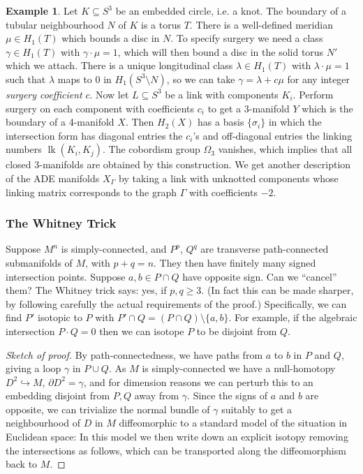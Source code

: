 \documentclass{article}
\theoremstyle{definition}
\newtheorem*{example}{Example}
\DeclareMathOperator{\lk}{lk}
\begin{document}
\begin{example}
    Let $K\subseteq S^3$ be an embedded circle, i.e. a knot. The boundary of a
    tubular neighbourhood $N$ of $K$ is a torus $T$. There is a well-defined
    meridian $\mu\in H_1(T)$ which bounds a disc in $N$. To specify surgery we
    need a class $\gamma\in H_1(T)$ with $\gamma\cdot\mu=1$, which will then
    bound a disc in the solid torus $N'$ which we attach. There is a unique
    longitudinal class $\lambda\in H_1(T)$ with $\lambda\cdot\mu=1$ such that
    $\lambda$ maps to 0 in $H_1(S^3\setminus N)$, so we can take
    $\gamma=\lambda+c\mu$ for any integer \emph{surgery coefficient} $c$. Now
    let $L\subseteq S^3$ be a link with components $K_i$. Perform surgery on
    each component with coefficients $c_i$ to get a 3-manifold $Y$ which is the
    boundary of a 4-manifold $X$. Then $H_2(X)$ has a basis $\{\sigma_i\}$ in 
    which the intersection form has diagonal entries the $c_i$'s and
    off-diagonal entries the linking numbers $\lk(K_i,K_j)$. The cobordism group
    $\Omega_3$ vanishes, which implies that all closed 3-manifolds are obtained
    by this construction. We get another description of the ADE manifolds
    $X_\Gamma$ by taking a link with unknotted components whose linking matrix
    corresponds to the graph $\Gamma$ with coefficients $-2$.
\end{example}

\subsubsection*{The Whitney Trick}

Suppose $M^n$ is simply-connected, and $P^p$, $Q^q$ are transverse
path-connected submanifolds of $M$, with $p+q=n$. They then have finitely many
signed intersection points. Suppose $a,b\in P\cap Q$ have opposite sign. Can we
``cancel'' them? The Whitney trick says: yes, if $p,q\ge3$. (In fact this can be
made sharper, by following carefully the actual requirements of the proof.)
Specifically, we can find $P'$ isotopic to $P$ with
$P'\cap Q=(P\cap Q)\setminus\{a,b\}$. For example, if the algebraic intersection
$P\cdot Q=0$ then we can isotope $P$ to be disjoint from $Q$.

\begin{proof}[Sketch of proof]
    By path-connectedness, we have paths from $a$ to $b$ in $P$ and $Q$, giving
    a loop $\gamma$ in $P\cup Q$. As $M$ is simply-connected we have a
    null-homotopy $D^2\hookrightarrow M$, $\partial D^2=\gamma$, and for
    dimension reasons we can perturb this to an embedding disjoint from $P,Q$
    away from $\gamma$. Since the signs of $a$ and $b$ are opposite, we can
    trivialize the normal bundle of $\gamma$ suitably to get a neighbourhood of
    $D$ in $M$ diffeomorphic to a standard model of the situation in Euclidean
    space:
    In this model we then write down an explicit isotopy removing the
    intersections as follows, which can be transported along the diffeomorphism
    back to $M$.
\end{proof}
\end{document}

